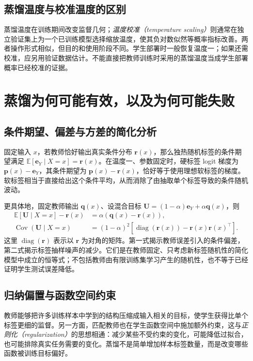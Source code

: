 \documentclass[UTF8,12pt,a4paper,fontset=fandol]{ctexart}
\begin{document}
\subsection{蒸馏温度与校准温度的区别}
蒸馏温度在训练期间改变监督几何；\emph{温度校准（temperature scaling）}则通常在独立验证集上为一个已训练模型选择缩放温度，使其负对数似然等概率指标改善。两者操作形式相似，但目的和使用阶段不同。学生部署时一般恢复温度一；如果还需校准，应另用验证数据估计。不能直接把教师训练时采用的蒸馏温度当成学生部署概率已经校准的证据。

\section{蒸馏为何可能有效，以及为何可能失败}
\label{sec:kd-mechanisms}

\subsection{条件期望、偏差与方差的简化分析}
固定输入 $x$，若教师恰好输出真实条件分布 $\mathbf r(x)$，那么独热随机标签的条件期望满足 $\mathbb E[\mathbf e_Y\mid X=x]=\mathbf r(x)$。在温度一、参数固定时，硬标签 logit 梯度为 $\mathbf p(x)-\mathbf e_Y$，其条件期望为 $\mathbf p(x)-\mathbf r(x)$，恰好等于使用理想软标签的梯度。软标签相当于直接给出这个条件平均，从而消除了由抽取单个标签导致的条件随机波动。

更具体地，固定教师输出 $\mathbf q(x)$、设混合目标 $\mathbf U=(1-\alpha)\mathbf e_Y+\alpha\mathbf q(x)$，则
\begin{align}
 \mathbb E[\mathbf U\mid X=x]-\mathbf r(x)
 &=\alpha(\mathbf q(x)-\mathbf r(x)),\label{eq:kd-target-bias}\\
 \operatorname{Cov}(\mathbf U\mid X=x)
 &=(1-\alpha)^2\left[\operatorname{diag}(\mathbf r(x))-
 \mathbf r(x)\mathbf r(x)^\top\right].\label{eq:kd-target-variance}
\end{align}
这里 $\operatorname{diag}(\mathbf r)$ 表示以 $\mathbf r$ 为对角的矩阵。第一式揭示教师误差引入的条件偏差，第二式揭示标签抽样噪声的减少。它们是在教师固定、只考虑新标签随机性的简化模型中成立的恒等式；不包括教师由有限训练集学习产生的随机性，也不等于已经证明学生测试误差降低。

\subsection{归纳偏置与函数空间约束}
教师能够把许多训练样本中学到的结构压缩成输入相关的目标，使学生获得比单个标签更细的监督。另一方面，匹配教师也在学生函数空间中施加额外约束，这与\emph{正则化（regularization）}的思想相通：减少某些不受约束的变化，可能降低过拟合，也可能排除真实任务需要的变化。蒸馏不是简单增加样本标签数量，而是改变哪些函数被训练目标偏好。
\end{document}
